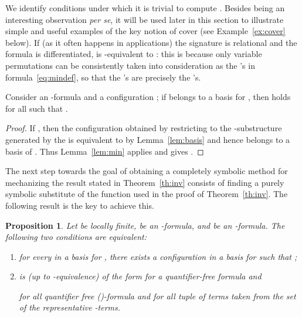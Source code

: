 \documentclass{LMCS}
\theoremstyle{plain}\newtheorem{assumption}[thm]{Assumption}
\theoremstyle{plain}\newtheorem{proposition}[thm]{Proposition}
\theoremstyle{plain}\newtheorem{property}[thm]{Property}
\theoremstyle{plain}\newtheorem{example}[thm]{Example}
\theoremstyle{plain}\newtheorem{claim}[thm]{Claim}
\theoremstyle{plain}\newtheorem{lemma}[thm]{Lemma}
\begin{document}
\begin{rem}
  \label{rem}
We identify conditions under which it is trivial to compute
  .  Besides being an interesting observation
  \emph{per se}, it will be used later in this section to illustrate
simple and useful examples of the key notion of cover (see
  Example~\ref{ex:cover} below).  If (as it often happens in
  applications) the signature  is relational and the formula
   is differentiated,  is
  -equivalent to : this is because only
  variable permutations can be consistently taken into consideration
  as the 's in formula~\eqref{eq:mindef}, so that the
  's are precisely the 's.
\end{rem}
\begin{cor}
  \label{coro:min}
  Consider an -formula 
  and a configuration ; if  belongs to a basis for ,
  then  holds for all  such that .
\end{cor}
\begin{proof}
  If , then the
  configuration  obtained by restricting  to the
  -substructure generated by the  is
  equivalent to  by Lemma~\ref{lem:basis} and hence belongs to a
  basis of .  Thus Lemma~\ref{lem:min} applies and gives .
\end{proof}
The next step towards the goal of obtaining a completely symbolic
method for mechanizing the result stated in Theorem~\ref{th:inv}
consists of finding a purely symbolic substitute
of the function  used in the proof of Theorem~\ref{th:inv}.
The following result is the key to achieve this.
\begin{proposition}
  \label{prop:sintsem}
  Let  be locally finite,  be
  an -formula, and  be an -formula. The
  following two conditions are equivalent:
  \begin{enumerate}[{\rm (i)}]
  \item for every  in
a basis for , there exists a configuration  in a basis for
     such that ;
  \item  is (up to -equivalence) of the form  for a quantifier-free formula
     and
    
    for all quantifier free ()-formula
     and for all tuple of terms  taken from the set
    of the representative -terms.
 \end{enumerate}
\end{proposition}
\end{document}
